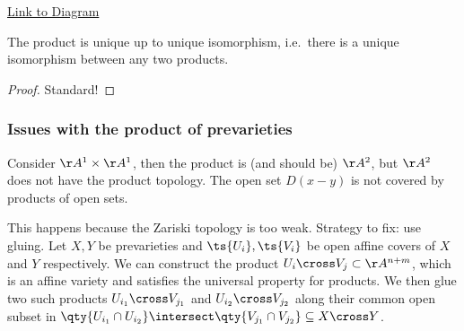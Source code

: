 \begin{center}
\end{center}

\href{https://tikzcd.yichuanshen.de/\#N4Igdg9gJgpgziAXAbVABwnAlgFyxMJZABgBpiBdUkANwEMAbAVxiRAAUQBfU9TXfIRQBGUsKq1GLNgC1uvEBmx4CRAExiJ9Zq0QgAGvL7LBRUWq1TdIAJrcJMKAHN4RUADMAThAC2SUSA4EEgAzDwe3n6IAUFIauEgXr7+1LGIZCAMWGDWUHRwABaOINTa0noAOhUwAB5YcDgICUlRGWkaIABGMGBQoRll1lVoWAD6hs2RSG3BiCHU3b1IALQhA1Zsw2N21Ax03Qzs-CpCIJ5YTgU49lxAA}{Link
to Diagram}

\begin{proposition}[?]

The product is unique up to unique isomorphism, i.e.~there is a unique
isomorphism between any two products.

\end{proposition}

\begin{proof}

Standard!

\end{proof}

\hypertarget{issues-with-the-product-of-prevarieties}{%
\subsubsection{Issues with the product of
prevarieties}\label{issues-with-the-product-of-prevarieties}}

\begin{example}

Consider \(\AA^1 \times \AA^1\), then the product is (and should be)
\(\AA^2\), but \(\AA^2\) does not have the product topology. The open
set \(D(x-y)\) is not covered by products of open sets.

\end{example}

This happens because the Zariski topology is too weak. Strategy to fix:
use gluing. Let \(X, Y\) be prevarieties and \(\ts{U_i}, \ts{V_i}\) be
open affine covers of \(X\) and \(Y\) respectively. We can construct the
product \(U_i \cross V_j \subset \AA^{n+m}\), which is an affine variety
and satisfies the universal property for products. We then glue two such
products \(U_{i_1} \cross V_{j_1}\) and \(U_{i_2} \cross V_{j_2}\) along
their common open subset in
\(\qty{U_{i_1}\cap U_{i_2} }\intersect\qty{V_{j_1} \cap V_{j_2}} \subseteq X\cross Y\).

